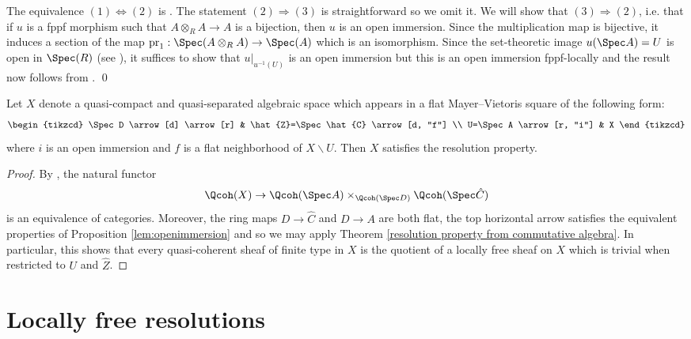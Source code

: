\documentclass[12pt]{amsart}
\begin{document}
\proof The equivalence $(1) \Leftrightarrow (2)$ is \cite[Prop. 2]{MR286805}. The statement $(2) \Rightarrow (3)$ is straightforward so we omit it. We will show that $(3) \Rightarrow (2)$, i.e. that if $u$ is a fppf morphism such that $A \otimes_R A \to A$ is a bijection, then $u$ is an open immersion. Since the multiplication map is bijective, it induces a section of the map $\text{pr}_1: \Spec (A \otimes_R A) \to \Spec (A)$ which is an isomorphism. Since the set-theoretic image $u(\Spec A)=U$ is open in $\Spec(R)$ (see \cite[Tag 01UA]{stacks}), it suffices to show that $u|_{u^{-1}(U)}$ is an open immersion but this is an open immersion fppf-locally and the result now follows from \cite[Tag 02L3]{stacks}.
\qed


\begin{corollary} \label{MVresolution} Let $X$ denote a quasi-compact and quasi-separated algebraic space which appears in a flat Mayer--Vietoris square of the following form:
\[\begin{tikzcd}
  \Spec D \arrow[d] \arrow[r] & \hat{Z}=\Spec \hat{C} \arrow[d, "f"]  \\
  U=\Spec A \arrow[r, "i"] &  X
  \end{tikzcd}
\]
where $i$ is an open immersion and $f$ is a flat neighborhood of $X \smallsetminus U$. Then $X$ satisfies the resolution property.
\end{corollary}

\begin{proof} By \cite[Thm. B (1)]{hall2016mayer}, the natural functor
\[\Qcoh(X) \to \Qcoh(\Spec A) \times_{\Qcoh(\Spec D)} \Qcoh(\Spec \hat{C})\]
is an equivalence of categories. Moreover, the ring maps $D \to \hat{C}$ and $D \to A$ are both flat, the top horizontal arrow satisfies the equivalent properties of Proposition \ref{lem:openimmersion} and so we may apply Theorem \ref{resolution property from commutative algebra}. In particular, this shows that every quasi-coherent sheaf of finite type in $X$ is the quotient of a locally free sheaf on $X$ which is trivial when restricted to $U$ and $\hat{Z}$. \end{proof} 

\section{Locally free resolutions} \label{resolutions}
\end{document}
